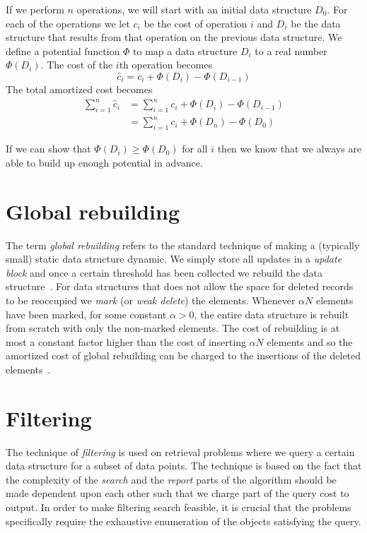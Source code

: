 \documentclass[twoside,11pt,openright]{report}
\begin{document}
If we perform $n$ operations, we will start with an initial data structure $D_0$. For each of the operations we let $c_i$ be the cost of operation $i$ and $D_i$ be the data structure that results from that operation on the previous data structure. We define a potential function $\Phi$ to map a data structure $D_i$ to a real number $\Phi(D_i)$. The cost of the $i$th operation becomes
$$\hat{c}_i = c_i + \Phi(D_i) - \Phi(D_{i-1})$$
The total amortized cost becomes
\begin{align*}
\sum_{i=1}^n \hat{c}_i &= \sum_{i=1}^n c_i + \Phi(D_i) - \Phi(D_{i-1}) \\
&= \sum_{i=1}^n c_i + \Phi(D_n) - \Phi(D_{0})
\end{align*}

If we can show that $\Phi(D_i) \geq \Phi(D_0)$ for all $i$ then we know that we always are able to build up enough potential in advance.

\section{Global rebuilding}
The term \textit{global rebuilding} refers to the standard technique of making a (typically small) static data structure dynamic. We simply store all updates in a \textit{update block} and once a certain threshold has been collected we rebuild the data structure~\cite{ionote}. For data structures that does not allow the space for deleted records to be reoccupied we \textit{mark} (or \textit{weak delete}) the elements. Whenever $\alpha N$ elements have been marked, for some constant $\alpha > 0$, the entire data structure is rebuilt from scratch with only the non-marked elements. The cost of rebuilding is at most a constant factor higher than the cost of inserting $\alpha N$ elements and so the amortized cost of global rebuilding can be charged to the insertions of the deleted elements~\cite{Meyer:2003/AMH/1744652}.

\section{Filtering}
The technique of \textit{filtering} is used on retrieval problems where we query a certain data structure for a subset of data points. The technique is based on the fact that the complexity of the \textit{search} and the \textit{report} parts of the algorithm should be made dependent upon each other such that we charge part of the query cost to output. In order to make filtering search feasible, it is crucial that the problems specifically require the exhaustive enumeration of the objects satisfying the query.
\end{document}
